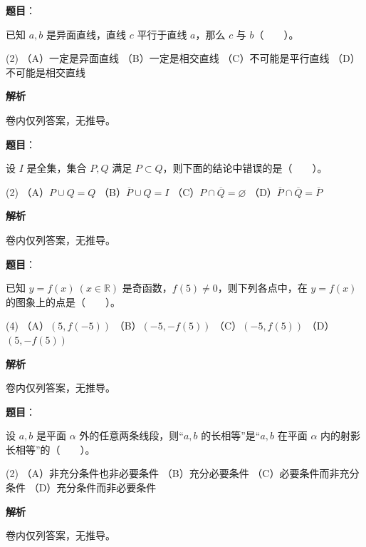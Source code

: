 \begin{answer}

\textbf{题目}：

已知 $a,b$ 是异面直线，直线 $c$ 平行于直线 $a$，那么 $c$ 与 $b$\mbox{（　　）}。

\begin{gkopts}(2)
\task （A）一定是异面直线
\task （B）一定是相交直线
\task （C）不可能是平行直线
\task （D）不可能是相交直线
\end{gkopts}

\textbf{解析}

卷内仅列答案，无推导。


\end{answer}
\begin{answer}

\textbf{题目}：

设 $I$ 是全集，集合 $P,Q$ 满足 $P\subset Q$，则下面的结论中错误的是\mbox{（　　）}。

\begin{gkopts}(2)
\task （A）$P\cup Q=Q$
\task （B）$\overline P\cup Q=I$
\task （C）$P\cap\overline Q=\varnothing$
\task （D）$\overline P\cap\overline Q=\overline P$
\end{gkopts}

\textbf{解析}

卷内仅列答案，无推导。


\end{answer}
\begin{answer}

\textbf{题目}：

已知 $y=f(x)\ (x\in\mathbb R)$ 是奇函数，$f(5)\ne0$，则下列各点中，在 $y=f(x)$ 的图象上的点是\mbox{（　　）}。

\begin{gkopts}(4)
\task （A）$(5,f(-5))$
\task （B）$(-5,-f(5))$
\task （C）$(-5,f(5))$
\task （D）$(5,-f(5))$
\end{gkopts}

\textbf{解析}

卷内仅列答案，无推导。


\end{answer}
\begin{answer}

\textbf{题目}：

设 $a,b$ 是平面 $\alpha$ 外的任意两条线段，则“$a,b$ 的长相等”是“$a,b$ 在平面 $\alpha$ 内的射影长相等”的\mbox{（　　）}。

\begin{gkopts}(2)
\task （A）非充分条件也非必要条件
\task （B）充分必要条件
\task （C）必要条件而非充分条件
\task （D）充分条件而非必要条件
\end{gkopts}

\textbf{解析}

卷内仅列答案，无推导。


\end{answer}
